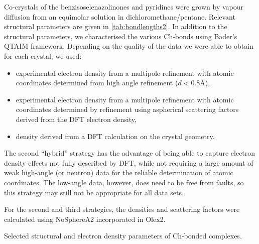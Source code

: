 \begin{refsection}
Co-crystals of the benzisoselenazolinones and pyridines were grown by vapour diffusion from an equimolar solution in dichloromethane/pentane.
Relevant structural parameters are given in \cref{tab:bondlengths2}.
In addition to the structural parameters, we characterised the various Ch-bonds using Bader's QTAIM framework.
Depending on the quality of the data we were able to obtain for each crystal, we used:

\begin{itemize}
    \item experimental electron density from a multipole refinement with atomic coordinates determined from high angle refinement ($d < 0.8$\AA),
    \item experimental electron density from a multipole refinement with atomic coordinates determined by refinement using aspherical scattering factors derived from the DFT electron density,
    \item density derived from a DFT calculation on the crystal geometry.
\end{itemize}

The second ``hybrid'' strategy has the advantage of being able to capture electron density effects not fully described by DFT, while not requiring a large amount of weak high-angle (or neutron) data for the reliable determination of atomic coordinates.
The low-angle data, however, does need to be free from faults, so this strategy may still not be appropriate for all data sets.

For the second and third strategies, the densities and scattering factors were calculated using NoSphereA2 incorporated in Olex2.\autocite{Kleemiss2021}

\begin{table}
  \centering
  \caption{Selected structural and electron density parameters of Ch-bonded complexes.}\label{tab:bondlengths2}


\end{table}
\end{refsection}
